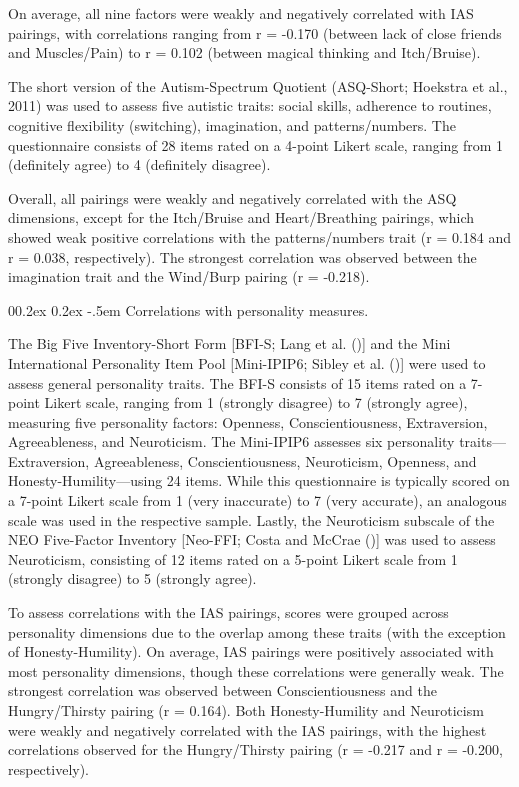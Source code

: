 \documentclass[
  man,
  floatsintext,
  longtable,
  nolmodern,
  notxfonts,
  notimes,
  colorlinks=true,linkcolor=blue,citecolor=blue,urlcolor=blue]{apa7}
\makeatletter
\renewcommand{\paragraph}{\@startsection{paragraph}{4}{\parindent}%
	{0\baselineskip \@plus 0.2ex \@minus 0.2ex}%
	{-.5em}%
	{\normalfont\normalsize\bfseries\typesectitle}}
\makeatother
\begin{document}
On average, all nine factors were weakly and negatively correlated with
IAS pairings, with correlations ranging from r = -0.170 (between lack of
close friends and Muscles/Pain) to r = 0.102 (between magical thinking
and Itch/Bruise).

The short version of the Autism-Spectrum Quotient (ASQ-Short; Hoekstra
et al., 2011) was used to assess five autistic traits: social skills,
adherence to routines, cognitive flexibility (switching), imagination,
and patterns/numbers. The questionnaire consists of 28 items rated on a
4-point Likert scale, ranging from 1 (definitely agree) to 4 (definitely
disagree).

Overall, all pairings were weakly and negatively correlated with the ASQ
dimensions, except for the Itch/Bruise and Heart/Breathing pairings,
which showed weak positive correlations with the patterns/numbers trait
(r = 0.184 and r = 0.038, respectively). The strongest correlation was
observed between the imagination trait and the Wind/Burp pairing (r =
-0.218).

\paragraph{Correlations with personality
measures.}\label{correlations-with-personality-measures}

The Big Five Inventory-Short Form {[}BFI-S; Lang et al.
(){]} and the Mini International
Personality Item Pool {[}Mini-IPIP6; Sibley et al.
(){]} were used to assess general
personality traits. The BFI-S consists of 15 items rated on a 7-point
Likert scale, ranging from 1 (strongly disagree) to 7 (strongly agree),
measuring five personality factors: Openness, Conscientiousness,
Extraversion, Agreeableness, and Neuroticism. The Mini-IPIP6 assesses
six personality traits---Extraversion, Agreeableness, Conscientiousness,
Neuroticism, Openness, and Honesty-Humility---using 24 items. While this
questionnaire is typically scored on a 7-point Likert scale from 1 (very
inaccurate) to 7 (very accurate), an analogous scale was used in the
respective sample. Lastly, the Neuroticism subscale of the NEO
Five-Factor Inventory {[}Neo-FFI; Costa and McCrae
(){]} was used to assess
Neuroticism, consisting of 12 items rated on a 5-point Likert scale from
1 (strongly disagree) to 5 (strongly agree).

To assess correlations with the IAS pairings, scores were grouped across
personality dimensions due to the overlap among these traits (with the
exception of Honesty-Humility). On average, IAS pairings were positively
associated with most personality dimensions, though these correlations
were generally weak. The strongest correlation was observed between
Conscientiousness and the Hungry/Thirsty pairing (r = 0.164). Both
Honesty-Humility and Neuroticism were weakly and negatively correlated
with the IAS pairings, with the highest correlations observed for the
Hungry/Thirsty pairing (r = -0.217 and r = -0.200, respectively).
\end{document}
